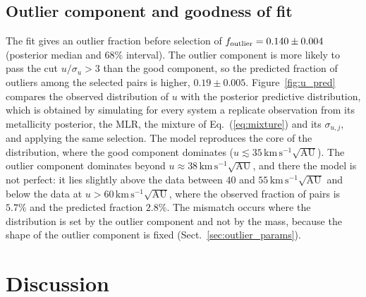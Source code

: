\documentclass{aa}
\newcommand{\kmsau}{\mathrm{km}\,\mathrm{s}^{-1}\sqrt{\mathrm{AU}}}
\begin{document}
\subsection{Outlier component and goodness of fit}
The fit gives an outlier fraction before selection of $f_{\rm outlier}=0.140\pm0.004$ (posterior median and $68\%$ interval). The outlier component is more likely to pass the cut $u/\sigma_u>3$ than the good component, so the predicted fraction of outliers among the selected pairs is higher, $0.19\pm0.005$. Figure~\ref{fig:u_pred} compares the observed distribution of $u$ with the posterior predictive distribution, which is obtained by simulating for every system a replicate observation from its metallicity posterior, the MLR, the mixture of Eq.~(\ref{eq:mixture}) and its $\sigma_{u,j}$, and applying the same selection. The model reproduces the core of the distribution, where the good component dominates ($u\lesssim35\,\kmsau$). The outlier component dominates beyond $u\approx38\,\kmsau$, and there the model is not perfect: it lies slightly above the data between $40$ and $55\,\kmsau$ and below the data at $u>60\,\kmsau$, where the observed fraction of pairs is $5.7\%$ and the predicted fraction $2.8\%$. 
The mismatch occurs where the distribution is set by the outlier component and not by the mass, because the shape of the outlier component is fixed (Sect.~\ref{sec:outlier_params}).


\section{Discussion}\label{sec:discussion}
\end{document}
